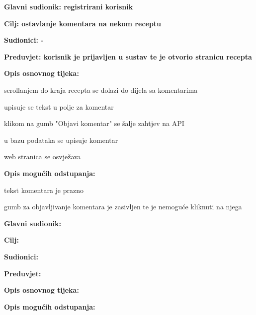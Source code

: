 					\noindent {}
					\begin{packed_item}
						\item \textbf{Glavni sudionik: registrirani korisnik}
						\item  \textbf{Cilj: ostavlanje komentara na nekom receptu}
						\item  \textbf{Sudionici: -}
						\item  \textbf{Preduvjet: korisnik je prijavljen u sustav te je otvorio stranicu recepta}
						
						\item  \textbf{Opis osnovnog tijeka:}
						\item[] \begin{packed_enum}
							\item scrollanjem do kraja recepta se dolazi do dijela sa komentarima
							\item upisuje se tekst u polje za komentar
							\item klikom na gumb "Objavi komentar" se šalje zahtjev na API
							\item u bazu podataka se upisuje komentar
							\item web stranica se osvježava
						\end{packed_enum}
						
						\item  \textbf{Opis mogućih odstupanja:}
						\item[] \begin{packed_item}
							\item[12.a] tekst komentara je prazno
							\begin{packed_enum}
								\item gumb za objavljivanje komentara je zasivljen te je nemoguće kliknuti na njega
							\end{packed_enum}
						\end{packed_item}
					\end{packed_item}
				
				
				
					\noindent \underbar{\textbf{UC}}
					\begin{packed_item}
						\item \textbf{Glavni sudionik: }
						\item  \textbf{Cilj:}
						\item  \textbf{Sudionici:}
						\item  \textbf{Preduvjet:}
						
						\item  \textbf{Opis osnovnog tijeka:}
						\item[] \begin{packed_enum}
						\end{packed_enum}
						
						\item  \textbf{Opis mogućih odstupanja:}
						\item[] \begin{packed_item}							
						\end{packed_item}
					\end{packed_item}
					

